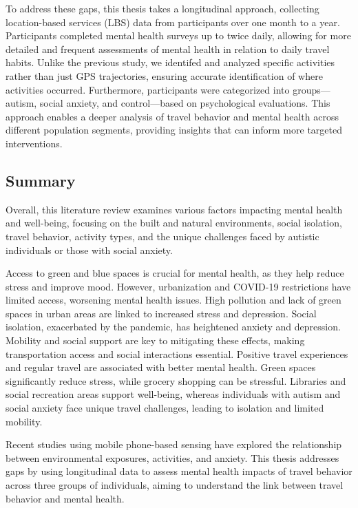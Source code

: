 \documentclass[
  letterpaper,
  number,
  review,
  3p]{elsarticle}
\begin{document}
To address these gaps, this thesis takes a longitudinal approach,
collecting location-based services (LBS) data from participants over one
month to a year. Participants completed mental health surveys up to
twice daily, allowing for more detailed and frequent assessments of
mental health in relation to daily travel habits. Unlike the previous
study, we identifed and analyzed specific activities rather than just
GPS trajectories, ensuring accurate identification of where activities
occurred. Furthermore, participants were categorized into
groups---autism, social anxiety, and control---based on psychological
evaluations. This approach enables a deeper analysis of travel behavior
and mental health across different population segments, providing
insights that can inform more targeted interventions.

\subsection{Summary}\label{summary}

Overall, this literature review examines various factors impacting
mental health and well-being, focusing on the built and natural
environments, social isolation, travel behavior, activity types, and the
unique challenges faced by autistic individuals or those with social
anxiety.

Access to green and blue spaces is crucial for mental health, as they
help reduce stress and improve mood. However, urbanization and COVID-19
restrictions have limited access, worsening mental health issues. High
pollution and lack of green spaces in urban areas are linked to
increased stress and depression. Social isolation, exacerbated by the
pandemic, has heightened anxiety and depression. Mobility and social
support are key to mitigating these effects, making transportation
access and social interactions essential. Positive travel experiences
and regular travel are associated with better mental health. Green
spaces significantly reduce stress, while grocery shopping can be
stressful. Libraries and social recreation areas support well-being,
whereas individuals with autism and social anxiety face unique travel
challenges, leading to isolation and limited mobility.

Recent studies using mobile phone-based sensing have explored the
relationship between environmental exposures, activities, and anxiety.
This thesis addresses gaps by using longitudinal data to assess mental
health impacts of travel behavior across three groups of individuals,
aiming to understand the link between travel behavior and mental health.
\end{document}
